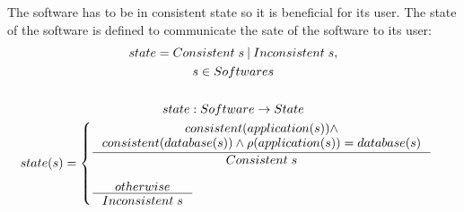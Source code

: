 \documentclass[11pt]{article}
\begin{document}
The software has to be in consistent state so it is beneficial for its user. The state of the software is defined to communicate the sate of the software to its user:
\begin{gather*}
	state = Consistent\; s \: | \: Inconsistent \; s, \\
	s \in Softwares  \\ \\
	state : Software \rightarrow State \\
	state(s) = \begin{cases}
 		\inference{consistent(application(s)) \wedge \\ consistent(database(s)) \wedge \rho(application(s)) = database(s)}{Consistent \; s}\\ \\
 		\inference{otherwise}{Inconsistent \; s}
 	\end{cases}
\end{gather*}
\end{document}
